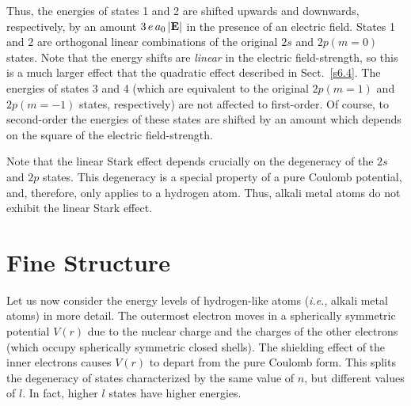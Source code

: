 Thus, the energies of states 1 and 2 are shifted upwards and downwards, respectively, 
by an amount $3\,e\,a_0\, |{\bf E}|$  in the presence of an electric field.
States 1 and 2 are orthogonal linear combinations of the original
$2s$ and $2p(m=0)$ states. 
 Note that
the energy shifts are {\em linear} in the electric field-strength, so this
is a much larger effect that the quadratic  effect described in Sect.~\ref{s6.4}.
The energies of states 3 and 4 (which are equivalent to the
original  $2p(m=1)$  and $2p(m=-1)$ states, respectively) 
are not affected to first-order. Of course, to second-order the energies of these states are shifted by an amount which depends on the
square of the electric field-strength. 

Note that the linear Stark effect depends crucially on the degeneracy of
the $2s$ and
$2p$ states. This degeneracy is a special property of
a pure Coulomb potential, and, therefore, only applies to a hydrogen atom.
Thus, alkali metal atoms do not exhibit the linear Stark effect. 
 
\section{Fine Structure} 
Let us now consider the energy levels of hydrogen-like atoms ({\em i.e.}, alkali
metal atoms) in more detail. The outermost electron moves in a spherically
symmetric potential $V(r)$ due to the nuclear charge and the charges of the
other electrons (which occupy spherically symmetric closed shells). The
shielding effect of the inner electrons causes $V(r)$ to depart from
the pure Coulomb form. This splits the degeneracy of states characterized by the
same value of $n$, but different values of $l$. In fact, higher $l$ states 
have higher energies. 

